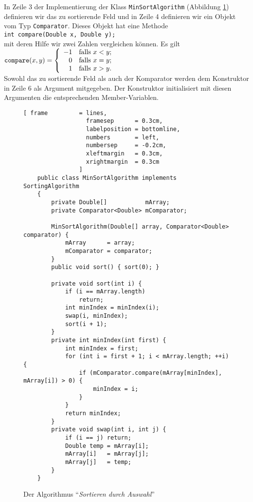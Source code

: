 In Zeile 3 der Implementierung der Klass \texttt{MinSortAlgorithm} (Abbildung
\ref{fig:MinSortAlgorithm.java})
 definieren wir das zu sortierende Feld und in Zeile 4 definieren wir ein Objekt
vom Typ \texttt{Comparator}.  Dieses Objekt hat eine Methode \\[0.1cm]
\hspace*{1.3cm} \texttt{int compare(Double x, Double y);}\\[0.1cm]
mit deren Hilfe wir zwei Zahlen vergleichen k\"onnen.  Es gilt \\[0.1cm]
\hspace*{1.3cm} 
$\mathtt{compare}(x,y) = \left\{
 \begin{array}[c]{rl}
  -1 & \mbox{falls $x < y$;} \\ 
   0 & \mbox{falls $x = y$;} \\ 
   1 & \mbox{falls $x > y$.} \\ 
 \end{array}\right.
$ %
\\[0.1cm]
Sowohl das zu sortierende Feld als auch der Komparator werden dem Konstruktor in Zeile 
6 als Argument mitgegeben.  Der Konstruktor initialisiert mit diesen Argumenten die
entsprechenden Member-Variablen.   

\begin{figure}[!ht]
  \centering
\begin{Verbatim}[ frame         = lines, 
                  framesep      = 0.3cm, 
                  labelposition = bottomline,
                  numbers       = left,
                  numbersep     = -0.2cm,
                  xleftmargin   = 0.3cm,
                  xrightmargin  = 0.3cm
                ]
    public class MinSortAlgorithm implements SortingAlgorithm
    {
        private Double[]           mArray;
        private Comparator<Double> mComparator;
    
        MinSortAlgorithm(Double[] array, Comparator<Double> comparator) {
            mArray      = array;
            mComparator = comparator;
        }
        public void sort() { sort(0); }
    
        private void sort(int i) {
            if (i == mArray.length)
                return;
            int minIndex = minIndex(i);
            swap(i, minIndex);
            sort(i + 1);
        }
        private int minIndex(int first) {
            int minIndex = first;
            for (int i = first + 1; i < mArray.length; ++i) {
                if (mComparator.compare(mArray[minIndex], mArray[i]) > 0) {
                    minIndex = i;
                }
            }
            return minIndex;
        }
        private void swap(int i, int j) {
            if (i == j) return;
            Double temp = mArray[i];
            mArray[i]   = mArray[j];
            mArray[j]   = temp;
        }
    }
\end{Verbatim}
\vspace*{-0.3cm}
  \caption{Der Algorithmus ``\emph{Sortieren durch Auswahl}''}
  \label{fig:MinSortAlgorithm.java}
\end{figure}

